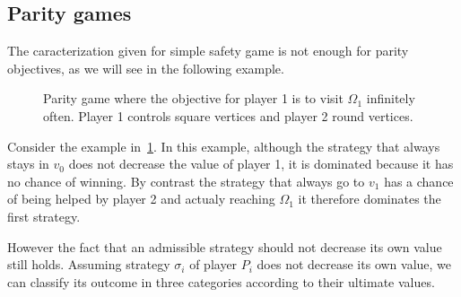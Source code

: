\subsection{Parity games}\label{parity-games}

The caracterization given for simple safety game is not enough for
parity objectives, as we will see in the following example.

\begin{figure}
  \begin{center}
  \end{center}
    \caption{Parity game where the objective for player 1 is to visit
      $\Omega_1$ infinitely often. Player 1 controls square vertices and player 2
      round vertices.}
    \label{13-fig:adm-parity}
\end{figure}

\begin{example}
  Consider the example in~\cref{13-fig:adm-parity}.
  In this example, although the strategy that always stays in $v_0$
  does not decrease the value of player 1, it is dominated because
  it has no chance of winning.
  By contrast the strategy that always go to $v_1$ has a chance of
  being helped by player 2 and actualy reaching $\Omega_1$ it therefore
  dominates the first strategy.
\end{example}

However the fact that an admissible strategy should not decrease its own
value still holds. Assuming strategy \(\sigma_i\) of player \(P_i\) does
not decrease its own value, we can classify its outcome in three
categories according to their ultimate values.


